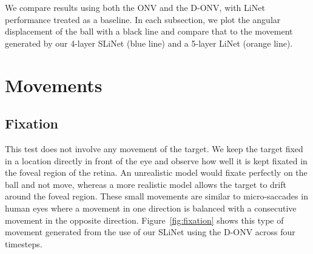 \documentclass [MS] {UCLAthesis}
\begin{document}
We compare results using both the ONV and the D-ONV, with LiNet performance treated as a baseline. In each subsection, we plot the angular displacement of the ball with a black line and compare that to the movement generated by our 4-layer SLiNet (blue line) and a 5-layer LiNet (orange line).

\section{Movements}

\subsection{Fixation}

This test does not involve any movement of the target. We keep the target fixed in a location directly in front of the eye and observe how well it is kept fixated in the foveal region of the retina. An unrealistic model would fixate perfectly on the ball and not move, whereas a more realistic model allows the target to drift around the foveal region. These small movements are similar to micro-saccades in human eyes where a movement in one direction is balanced with a consecutive movement in the opposite direction. Figure~\ref{fig:fixation} shows this type of movement generated from the use of our SLiNet using the D-ONV across four timesteps.
\end{document}
